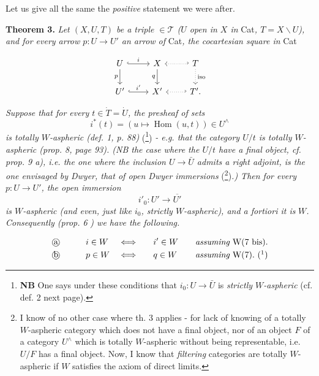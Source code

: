\documentclass[11pt]{article}
\newcommand{\printedpage}[1]{\marginpar{\footnotesize p.~#1}}
\newcommand{\msp}[1]{\marginpar{\footnotesize [#1]}}
\begin{document}
Let us give all the same the \textit{positive} statement we were after. %

\textbf{Theorem 3.} \textit{Let $(X,U,T)$ be a triple $\in\mathcal{T}$ ($U$ open in $X$ in} Cat\textit{, $T=X\backslash U$), and for every arrow $p:U\longrightarrow U'$ an arrow of} Cat\textit{, the cocartesian square in} Cat

\[
\begin{tikzcd}
U \arrow[r, hook, "i"] \arrow[d, "p"'] & X \arrow[d, "q"'] & T \arrow[l, dotted, hook'] \arrow[d, dotted, "\text{iso}"] \\
U' \arrow[r, hook, "i'"] & X' & T'. \arrow[l, dotted, hook']
\end{tikzcd}
\]

\printedpage{75}

\msp{page 108}

\textit{Suppose that for every $t\in\dot{T}=\dot{U}$, the presheaf of sets}
\[ i^*(t)=(u\longmapsto\operatorname{Hom}(u,t))\in U^\wedge \]
\textit{is totally $W$-aspheric (def. 1, p. 88)} (\footnote{\textbf{NB} One says under these conditions that $i_0:U\longrightarrow\bar{U}$ is \textit{strictly $W$-aspheric} (cf. def. 2 next page).}) \textit{- e.g. that the category $U/t$ is totally $W$-aspheric (prop. 8, page 93). (NB the case where the $U/t$ have a final object, cf. prop. 9 a), i.e. the one where the inclusion $U\longrightarrow\bar{U}$ admits a right adjoint, is the one envisaged by Dwyer, that of open Dwyer immersions} (\footnote{I know of no other case where th. 3 applies - for lack of knowing of a totally $W$-aspheric category which does not have a final object, nor of an object $F$ of a category $U^\wedge$ which is totally $W$-aspheric without being representable, i.e. $U/F$ has a final object. Now, I know that \textit{filtering} categories are totally $W$-aspheric if $W$ satisfies the axiom of direct limits.})\textit{.) Then for every $p:U\longrightarrow U'$, the open immersion}
\[ i'_0:U'\longrightarrow\overline{U'} \]
\textit{is $W$-aspheric (and even, just like $i_0$, strictly $W$-aspheric), and a fortiori it is} \textit{$W$. Consequently (prop. 6} \textit{) we have the following.}

\[
\begin{aligned}
&\text{\textcircled{a}}\qquad && i\in W && \Longleftrightarrow\quad && i'\in W\quad && \textit{assuming } \mathrm{W}(7\text{ bis}).\\
&\text{\textcircled{b}}\qquad && p\in W && \Longleftrightarrow\quad && q\in W\quad && \textit{assuming } \mathrm{W}(7).\ (\footnotemark)
\end{aligned}
\]
\end{document}
